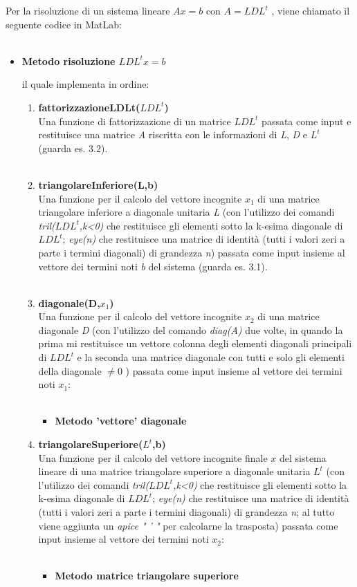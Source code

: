 Per la risoluzione di un sistema lineare $Ax=b$ con $A=LDL^t$ , viene chiamato il seguente codice in MatLab:\\\
\begin{itemize}
\item \textbf{Metodo risoluzione $LDL^tx=b$}

il quale implementa in ordine:
\begin{enumerate}
\item \textbf{fattorizzazioneLDLt($LDL^t$)}\\
Una funzione di fattorizzazione di un matrice $LDL^t$ passata come input e restituisce una matrice \textit{A} riscritta con le informazioni di \textit{L}, \textit{D} e $L^t$ (guarda es. 3.2).\\\
\item \textbf{triangolareInferiore(L,b)}\\
Una funzione per il calcolo del vettore incognite $x_1$ di una matrice triangolare inferiore a diagonale unitaria \textit{L} (con l'utilizzo dei comandi \textit{tril($LDL^t$,k<0)} che restituisce gli elementi sotto la k-esima diagonale di $LDL^t$; \textit{eye(n)} che restituisce una matrice di identità (tutti i valori zeri a parte i termini diagonali) di grandezza \textit{n}) passata come input insieme al vettore dei termini noti \textit{b} del sistema (guarda es. 3.1). \\\
\item \textbf{diagonale(D,$x_1$)}\\
Una funzione per il calcolo del vettore incognite $x_2$ di una matrice diagonale \textit{D} (con l'utilizzo del comando \textit{diag(A)} due volte, in quando la prima mi restituisce un vettore colonna degli elementi diagonali principali di $LDL^t$ e la seconda una matrice diagonale con tutti e solo gli elementi della diagonale $\neq 0$ ) passata come input insieme al vettore dei termini noti $x_1$:\\\
\begin{itemize}
\item \textbf{Metodo 'vettore' diagonale}

\end{itemize}
\item \textbf{triangolareSuperiore($L^t$,b)}\\
Una funzione per il calcolo del vettore incognite finale $x$ del sistema lineare di una matrice triangolare superiore a diagonale unitaria \textit{$L^t$} (con l'utilizzo dei comandi \textit{tril($LDL^t$,k<0)} che restituisce gli elementi sotto la k-esima diagonale di $LDL^t$; \textit{eye(n)} che restituisce una matrice di identità (tutti i valori zeri a parte i termini diagonali) di grandezza \textit{n}; al tutto viene aggiunta un \textit{apice " ' "} per calcolarne la trasposta) passata come input insieme al vettore dei termini noti $x_2$:\\\
\begin{itemize}
\item \textbf{Metodo matrice triangolare superiore}

\end{itemize}
\end{enumerate}
\end{itemize}
